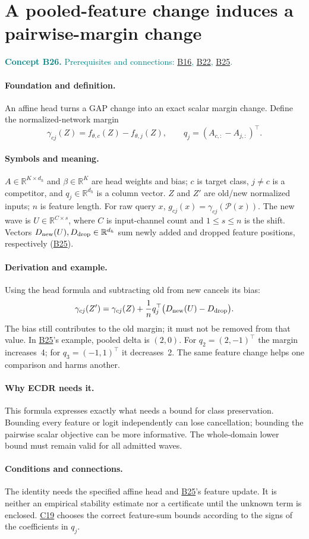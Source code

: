 \documentclass[11pt,a4paper]{article}
\newcommand{\R}{\mathbb R}
\newcommand{\conceptid}{Front matter}
\newcommand{\concept}[3]{\clearpage\renewcommand{\conceptid}{#1}%
\section{#2}\label{concept:#1}%
\textcolor{teal}{\textbf{Concept #1.} Prerequisites and connections: #3.}\par
\typeout{ECDR-CONCEPT-START #1 PAGE=\thepage}}
\begin{document}
\concept{B26}{A pooled-feature change induces a pairwise-margin change}{\hyperref[concept:B16]{B16}, \hyperref[concept:B22]{B22}, \hyperref[concept:B25]{B25}}
\paragraph{Foundation and definition.}
An affine head turns a GAP change into an exact scalar margin change.
Define the normalized-network margin
\[
 \gamma_{cj}(Z)=f_{\theta,c}(Z)-f_{\theta,j}(Z),\qquad
 q_j=(A_{c,:}-A_{j,:})^\top.
\]
\paragraph{Symbols and meaning.}
$A\in\R^{K\times d_h}$ and $\beta\in\R^K$ are head weights and bias;
$c$ is target class, $j\ne c$ is a competitor, and $q_j\in\R^{d_h}$
is a column vector. $Z$ and $Z'$ are old/new normalized inputs;
$n$ is feature length. For raw query $x$, $g_{cj}(x)=\gamma_{cj}(\mathcal P(x))$.
The new wave is $U\in\R^{C\times s}$, where $C$ is input-channel count and
$1\le s\le n$ is the shift. Vectors $D_{\rm new}(U),D_{\rm drop}\in\R^{d_h}$
sum newly added and dropped feature positions, respectively (\hyperref[concept:B25]{B25}).
\paragraph{Derivation and example.}
Using the head formula and subtracting old from new cancels its bias:
\[
 \gamma_{cj}(Z')=\gamma_{cj}(Z)+
 \frac1nq_j^\top\big(D_{\rm new}(U)-D_{\rm drop}\big).
\]
The bias still contributes to the old margin; it must not be removed
from that value. In \hyperref[concept:B25]{B25}'s example, pooled delta is $(2,0)$.
For $q_2=(2,-1)^\top$ the margin increases~4; for
$q_3=(-1,1)^\top$ it decreases~2. The same feature change helps one
comparison and harms another.
\paragraph{Why ECDR needs it.}
This formula expresses exactly what needs a bound for class preservation.
Bounding every feature or logit independently can lose cancellation;
bounding the pairwise scalar objective can be more informative. The
whole-domain lower bound must remain valid for all admitted waves.
\paragraph{Conditions and connections.}
The identity needs the specified affine head and \hyperref[concept:B25]{B25}'s feature update.
It is neither an empirical stability estimate nor a certificate until
the unknown term is enclosed. \hyperref[concept:C19]{C19} chooses the correct feature-sum bounds
according to the signs of the coefficients in $q_j$.
\par\label{endconcept:B26}
\end{document}
